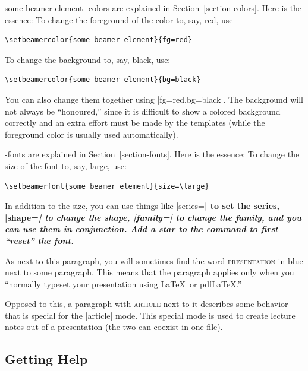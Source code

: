 \begin{element}{some beamer element}
  \beamer-colors are explained in Section~\ref{section-colors}. Here is the essence: To change the foreground of the color to, say, red, use
\begin{verbatim}
\setbeamercolor{some beamer element}{fg=red}
\end{verbatim}

  To change the background to, say, black, use:
\begin{verbatim}
\setbeamercolor{some beamer element}{bg=black}
\end{verbatim}

  You can also change them together using |fg=red,bg=black|. The background will not always be ``honoured,'' since it is difficult to show a colored background correctly and an extra effort must be made by the templates (while the foreground color is usually used automatically).

  \beamer-fonts are explained in Section~\ref{section-fonts}. Here is the essence: To change the size of the font to, say, large, use:
\begin{verbatim}
\setbeamerfont{some beamer element}{size=\large}
\end{verbatim}

  In addition to the size, you can use things like |series=\bfseries| to set the series, |shape=\itshape| to change the shape, |family=\sffamily| to change the family, and you can use them in conjunction. Add a star to the command to first ``reset'' the font.
\end{element}

\beamernote
As next to this paragraph, you will sometimes find the word \textsc{presentation} in blue next to some paragraph. This means that the paragraph applies only when you ``normally typeset your presentation using \LaTeX\ or pdf\LaTeX.''

\articlenote
Opposed to this, a paragraph with \textsc{article} next to it describes some behavior that is special for the |article| mode. This special mode is used to create lecture notes out of a presentation (the two can coexist in one file).

\endgroup


\subsection{Getting Help}

